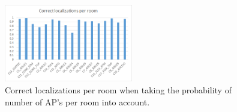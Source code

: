 \documentclass[a4paper,10pt,twoside]{IEEEtran}
\begin{document}
\begin{figure}[h!]
  \centering
    \includegraphics[width=0.5\textwidth]{correctness_perroom}
    \caption{Correct localizations per room when taking the probability of number of AP's per room into account.}
    \label{fig:correctness-perroom}
\end{figure}
\end{document}
